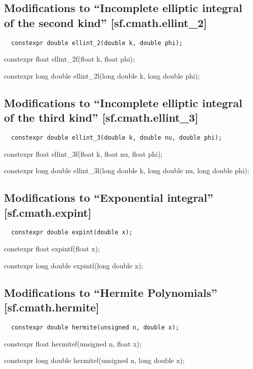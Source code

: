 \documentclass[prd,twocolumn,amsmath,amssymb,nofootinbib,eqsecnum]{revtex4-1}
\newcommand{\code}[1]{{\tt #1}}
\newcommand{\highlight}[1]{{\color{red} #1}}
\newcommand{\bigund}{{\Huge{\_}}}
\begin{document}
\subsection{Modifications to  ``Incomplete elliptic integral of the second kind''  [sf.cmath.ellint{\bigund}2]}

\code{
	\highlight{constexpr} double ellint\_2(double k, double phi);
	
	\highlight{constexpr} float ellint\_2f(float k, float phi);
	
	\highlight{constexpr} long double ellint\_2l(long double k, long double phi);

}

\subsection{Modifications to  ``Incomplete elliptic integral of the third kind''  [sf.cmath.ellint{\bigund}3]}

\code{
	\highlight{constexpr} double ellint\_3(double k, double nu, double phi);
	
	\highlight{constexpr} float ellint\_3f(float k, float nu, float phi);
	
	\highlight{constexpr} long double ellint\_3l(long double k, long double nu, long double phi);

}

\subsection{Modifications to  ``Exponential integral''  [sf.cmath.expint]}

\code{
	\highlight{constexpr} double expint(double x);
	
	\highlight{constexpr} float expintf(float x);
	
	\highlight{constexpr} long double expintl(long double x);

}

\subsection{Modifications to  ``Hermite Polynomials''  [sf.cmath.hermite]}

\code{
	\highlight{constexpr} double hermite(unsigned n, double x);
	
	\highlight{constexpr} float hermitef(unsigned n, float x);
	
	\highlight{constexpr} long double hermitel(unsigned n, long double x);

}
\end{document}
